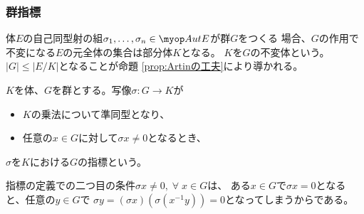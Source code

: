 {\subsubsection{群指標}\label{s3:群指標} %
	\begin{minipage}{0.9\hsize}{\small
	体$E$の自己同型射の組$\sigma_1,\dots,\sigma_n\in\Aut E$が群$G$をつくる
	場合、$G$の作用で不変になる$E$の元全体の集合は部分体$K$となる。
	$K$を$G$の不変体という。$|G|\le|E/K|$となることが命題
	\ref{prop:Artinの工夫}により導かれる。
	}\end{minipage}\medskip

	$K$を体、$G$を群とする。写像$\sigma:G\to K$が
	\begin{itemize}\setlength{\itemsep}{-1mm} %
		\item $K$の乗法について準同型となり、
		\item 任意の$x\in G$に対して$\sigma x\neq0$となるとき、
	\end{itemize} %
	$\sigma$を$K$における$G$の指標という。

	指標の定義での二つ目の条件$\sigma x\neq0,\;\forall\; x\in G$は、
	ある$x\in G$で$\sigma x=0$となると、任意の$y\in G$で
	$\sigma y=(\sigma x)(\sigma(x^{-1}y))=0$となってしまうからである。

}
